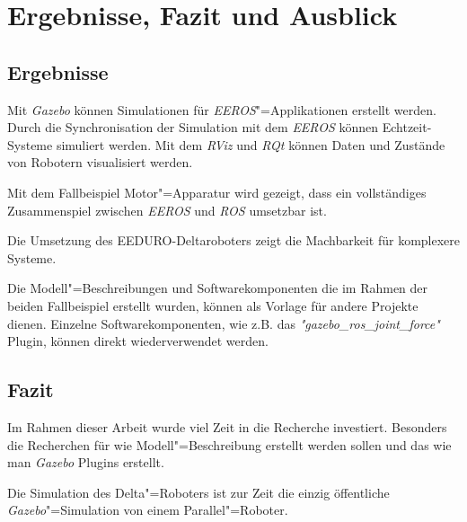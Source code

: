 \chapter{Ergebnisse, Fazit und Ausblick}

\section{Ergebnisse}

Mit \textit{Gazebo} können Simulationen für \textit{EEROS}"=Applikationen erstellt werden.
Durch die Synchronisation der Simulation mit dem \textit{EEROS} können Echtzeit-Systeme simuliert werden.
Mit dem \textit{RViz} und \textit{RQt} können Daten und Zustände von Robotern visualisiert werden.


Mit dem Fallbeispiel Motor"=Apparatur wird gezeigt, dass ein vollständiges Zusammenspiel zwischen \textit{EEROS} und \textit{ROS} umsetzbar ist.

Die Umsetzung des EEDURO-Deltaroboters zeigt die Machbarkeit für komplexere Systeme.

Die Modell"=Beschreibungen und Softwarekomponenten die im Rahmen der beiden Fallbeispiel erstellt wurden, können als Vorlage für andere Projekte dienen.
Einzelne Softwarekomponenten, wie z.B. das \textit{"gazebo\_ros\_joint\_force"} Plugin, können direkt wiederverwendet werden. 



\section{Fazit}
Im Rahmen dieser Arbeit wurde viel Zeit in die Recherche investiert.
Besonders die Recherchen für wie Modell"=Beschreibung erstellt werden sollen und das wie man \textit{Gazebo} Plugins erstellt.

Die Simulation des Delta"=Roboters ist zur Zeit die einzig öffentliche \textit{Gazebo}"=Simulation von einem Parallel"=Roboter.

